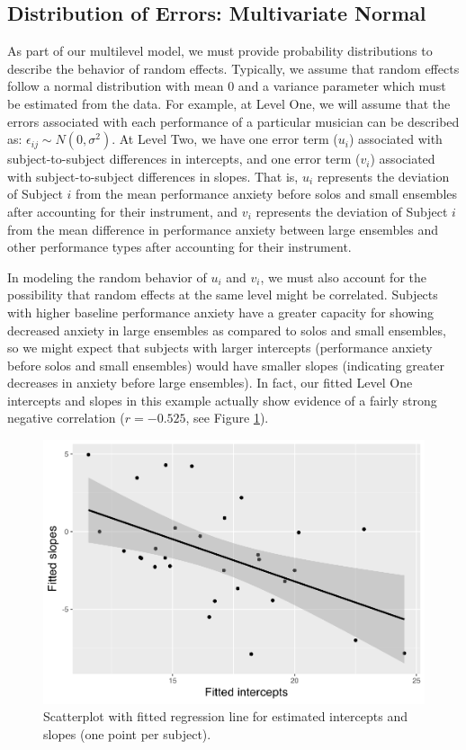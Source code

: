 \documentclass[
]{krantz}
\begin{document}
\subsection{Distribution of Errors: Multivariate Normal}\label{MVN}

As part of our multilevel model, we must provide probability distributions to describe the behavior of random effects. Typically, we assume that random effects follow a normal distribution with mean 0 and a variance parameter which must be estimated from the data. For example, at Level One, we will assume that the errors associated with each performance of a particular musician can be described as: \(\epsilon_{ij}\sim N(0,\sigma^2)\). At Level Two, we have one error term (\(u_{i}\)) associated with subject-to-subject differences in intercepts, and one error term (\(v_{i}\)) associated with subject-to-subject differences in slopes. That is, \(u_{i}\) represents the deviation of Subject \(i\) from the mean performance anxiety before solos and small ensembles after accounting for their instrument, and \(v_{i}\) represents the deviation of Subject \(i\) from the mean difference in performance anxiety between large ensembles and other performance types after accounting for their instrument.

In modeling the random behavior of \(u_{i}\) and \(v_{i}\), we must also account for the possibility that random effects at the same level might be correlated. Subjects with higher baseline performance anxiety have a greater capacity for showing decreased anxiety in large ensembles as compared to solos and small ensembles, so we might expect that subjects with larger intercepts (performance anxiety before solos and small ensembles) would have smaller slopes (indicating greater decreases in anxiety before large ensembles). In fact, our fitted Level One intercepts and slopes in this example actually show evidence of a fairly strong negative correlation (\(r=-0.525\), see Figure \ref{fig:mli-scat1}).

\begin{figure}

{\centering \includegraphics[width=0.6\linewidth]{bookdown-BeyondMLR_files/figure-latex/mli-scat1-1} 

}

\caption{Scatterplot with fitted regression line for estimated intercepts and slopes (one point per subject).}\label{fig:mli-scat1}
\end{figure}
\end{document}
